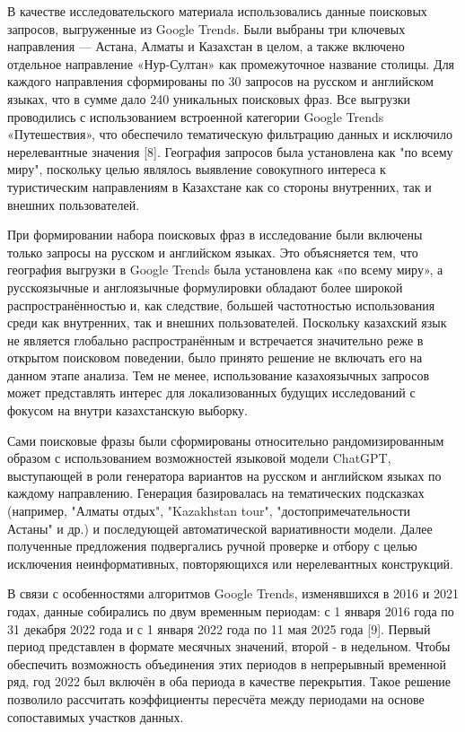 \begin{multicols}{2}
В качестве исследовательского материала использовались данные поисковых
запросов, выгруженные из Google Trends. Были выбраны три ключевых
направления --- Астана, Алматы и Казахстан в целом, а также включено
отдельное направление «Нур-Султан» как промежуточное название столицы.
Для каждого направления сформированы по 30 запросов на русском и
английском языках, что в сумме дало 240 уникальных поисковых фраз. Все
выгрузки проводились с использованием встроенной категории Google Trends
«Путешествия», что обеспечило тематическую фильтрацию данных и исключило
нерелевантные значения {[}8{]}. География запросов была установлена как
"по всему миру", поскольку целью являлось выявление совокупного интереса
к туристическим направлениям в Казахстане как со стороны внутренних, так
и внешних пользователей.

При формировании набора поисковых фраз в исследование были включены
только запросы на русском и английском языках. Это объясняется тем, что
география выгрузки в Google Trends была установлена как «по всему миру»,
а русскоязычные и англоязычные формулировки обладают более широкой
распространённостью и, как следствие, большей частотностью использования
среди как внутренних, так и внешних пользователей. Поскольку казахский
язык не является глобально распространённым и встречается значительно
реже в открытом поисковом поведении, было принято решение не включать
его на данном этапе анализа. Тем не менее, использование казахоязычных
запросов может представлять интерес для локализованных будущих
исследований с фокусом на внутри казахстанскую выборку.

Сами поисковые фразы были сформированы относительно рандомизированным
образом с использованием возможностей языковой модели ChatGPT,
выступающей в роли генератора вариантов на русском и английском языках
по каждому направлению. Генерация базировалась на тематических
подсказках (например, "Алматы отдых", "Kazakhstan tour",
"достопримечательности Астаны" и др.) и последующей автоматической
вариативности модели. Далее полученные предложения подвергались ручной
проверке и отбору с целью исключения неинформативных, повторяющихся или
нерелевантных конструкций.

В связи с особенностями алгоритмов Google Trends, изменявшихся в 2016 и
2021 годах, данные собирались по двум временным периодам: с 1 января
2016 года по 31 декабря 2022 года и с 1 января 2022 года по 11 мая 2025
года {[}9{]}. Первый период представлен в формате месячных значений,
второй - в недельном. Чтобы обеспечить возможность объединения этих
периодов в непрерывный временной ряд, год 2022 был включён в оба периода
в качестве перекрытия. Такое решение позволило рассчитать коэффициенты
пересчёта между периодами на основе сопоставимых участков данных.


\end{multicols}
